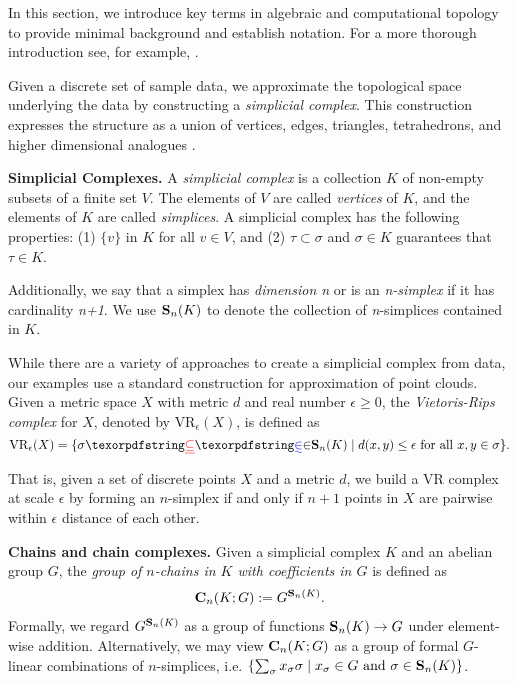 In this section, we introduce key terms in algebraic and computational topology to provide minimal background and establish notation. For a more thorough introduction see, for example, \cite{Carlsson2009TopologyAD, hatcher2002algebraic, edelsbrunner2010computational, barcodeGhrist, persistenthomologyasurvey,TZH15}. 

 
Given a discrete set of sample data, we approximate the topological space underlying the data by constructing a \textit{simplicial complex}. This construction expresses the structure as a union of vertices, edges, triangles, tetrahedrons, and higher dimensional analogues  \cite{Carlsson2009TopologyAD}.  



\noindent \textbf{Simplicial Complexes.} A \textit{simplicial complex} is a collection $K$ of non-empty subsets of a finite set $V$. The elements of $V$ are called \textit{vertices} of $K$, and the elements of $K$ are called \textit{simplices}. A simplicial complex has the following properties: (1) $\{v\}$ in $K$ for all $v \in V$, and (2) $\tau \subset \sigma$ and $\sigma \in K$ guarantees that $\tau \in K$. 


Additionally, we say that a simplex has \textit{dimension n} or is an \textit{n-simplex} if it has cardinality \textit{n+1}. We use $\mathbf{S}_n(K)$ to denote the collection of \textit{n}-simplices contained in $K$. 


While there are a variety of approaches to create a simplicial complex from data, our examples use a standard construction for approximation of point clouds.  Given a metric space $X$ with metric $d$ and real number $\epsilon \ge 0$, the \textit{Vietoris-Rips complex} for $X$, denoted by $\text{VR}_\epsilon(X)$, is defined as $$\text{VR}_\epsilon (X) = \{\sigma \DIFdelbegin \DIFdel{\subseteq }\DIFdelend \DIFaddbegin \DIFadd{\in }\DIFaddend \Simplices_n(K) \mid d(x,y) \leq  \epsilon \text{ for all } x, y \in \sigma\}.$$
That is, given a set of discrete points $X$ and a metric $d$, we build a VR complex at scale $\epsilon$ by forming an $n$-simplex if and only if $n+1$ points in $X$ are pairwise within $\epsilon$ distance of each other. 

\noindent \textbf{Chains and chain complexes.}
Given a simplicial complex $K$ and an abelian group  $G$, the \emph{group of $n$-chains in $K$ with coefficients in $G$} is defined as
%
    \begin{align*}
        \mathbf{C}_n(K; G) 
        :=
        G^{\mathbf{S}_n(K)}.
    \end{align*}
%    
Formally, we regard $G^{\mathbf{S}_n(K)}$ as a group of functions $\mathbf{S}_n(K) \to G$ under element-wise addition. Alternatively, we may view $\mathbf{C}_n(K; G)$ as a group of formal $G$-linear combinations of $n$-simplices, i.e. $\left \{\sum_{\sigma}x_{\sigma} \sigma \mid x_{\sigma} \in G \text{ and } \sigma \in \mathbf{S}_n(K) \right \}$.

